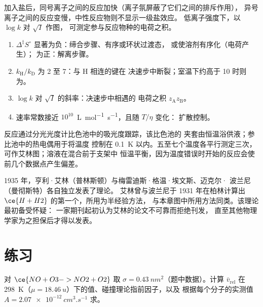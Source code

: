 加入盐后，同号离子之间的反应加快（离子氛屏蔽了它们之间的排斥作用），
异号离子之间的反应变慢，中性反应物则不显示一级盐效应。
低离子强度下，以 $\log k$ 对 $\sqrt I$ 作图，
可测定参与反应物种的电荷之积。

\begin{method}[活化参数如何揭示反应机理]\label{met:b3:rate-theories:mechanism-evidence}
\begin{enumerate}
  \item $\Delta^{\ddagger}S^\circ$ 显著为负：缔合步骤、有序或环状过渡态，
        或使溶剂有序化（电荷产生）；
        为正：解离步骤。
  \item {} $k_{\mathrm H}/k_{\mathrm D}$ 为 2 至 7：与 H 相连的键在
        决速步中断裂；室温下约高于 10 时则为。
  \item $\log k$ 对 $\sqrt I$ 的斜率：决速步中相遇的
        电荷之积 $z_{\mathrm A}z_{\mathrm B}$。
  \item 速率常数接近 $10^{10}$~\unit{L.mol^{-1}.s^{-1}}，且随 $T/\eta$ 变化：
        扩散控制。
\end{enumerate}
\end{method}

\begin{inthelab}[用于艾林研究的夹套比色池]
反应通过分光光度计比色池中的吸光度跟踪，该比色池的
夹套由恒温浴供液；参比池中的热电偶用于将温度
控制在 \qty{0.1}{K} 以内。五至七个温度各平行测定三次，
可作艾林图；溶液在混合前于支架中
恒温平衡，因为温度错误时开始的反应会使
前几个数据点产生偏差。
\end{inthelab}

\begin{history}[艾林、埃文斯与波兰尼，1935 年]
1935 年，亨利·艾林（普林斯顿）与梅雷迪斯·格温·埃文斯、迈克尔·
波兰尼（曼彻斯特）各自独立发表了理论。
艾林曾与波兰尼于 1931 年在柏林计算出
$\ce{H + H2}$ 的第一个，所用为半经验方法，
与本章图中所用方法同类。该理论最初备受怀疑：
一家期刊起初认为艾林的论文不可靠而拒绝刊发，
直至其他物理学家为之担保后才得以发表。
\end{history}

\section{练习}

\begin{exercise}[$\star$]\label{exo:b3:rate-theories:1}
对 $\ce{NO + O3 -> NO2 + O2}$ 取 $\sigma = \qty{0.43}{nm^2}$（题中数据）。计算 $\bar v_{\mathrm{rel}}$
在 \qty{298}{K}（$\mu = \qty{18.46}{u}$）下的值、碰撞理论指前因子，以及
根据每个分子的实测值 $A = \qty{2.07e-12}{cm^3.s^{-1}}$ 求。
\end{exercise}


